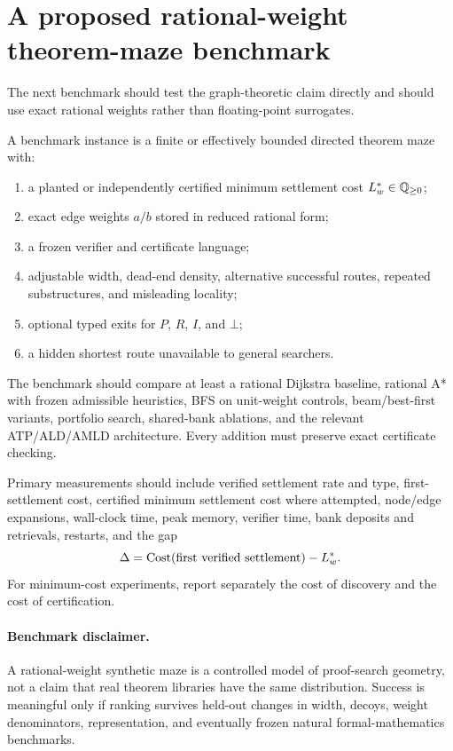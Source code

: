\section{A proposed rational-weight theorem-maze benchmark}
The next benchmark should test the graph-theoretic claim directly and should use exact rational weights rather than floating-point surrogates.

\begin{definition}
A benchmark instance is a finite or effectively bounded directed theorem maze with:
\begin{enumerate}
\item a planted or independently certified minimum settlement cost $L_w^*\in\mathbb{Q}_{\ge 0}$;
\item exact edge weights $a/b$ stored in reduced rational form;
\item a frozen verifier and certificate language;
\item adjustable width, dead-end density, alternative successful routes, repeated substructures, and misleading locality;
\item optional typed exits for $P$, $R$, $I$, and $\bot$;
\item a hidden shortest route unavailable to general searchers.
\end{enumerate}
\end{definition}

The benchmark should compare at least a rational Dijkstra baseline, rational A* with frozen admissible heuristics, BFS on unit-weight controls, beam/best-first variants, portfolio search, shared-bank ablations, and the relevant ATP/ALD/AMLD architecture. Every addition must preserve exact certificate checking.

Primary measurements should include verified settlement rate and type, first-settlement cost, certified minimum settlement cost where attempted, node/edge expansions, wall-clock time, peak memory, verifier time, bank deposits and retrievals, restarts, and the gap
\[
\Delta=\operatorname{Cost}(\text{first verified settlement})-L_w^*.
\]
For minimum-cost experiments, report separately the cost of discovery and the cost of certification.

\paragraph{Benchmark disclaimer.}
A rational-weight synthetic maze is a controlled model of proof-search geometry, not a claim that real theorem libraries have the same distribution. Success is meaningful only if ranking survives held-out changes in width, decoys, weight denominators, representation, and eventually frozen natural formal-mathematics benchmarks.

